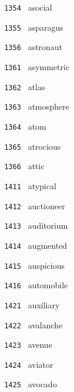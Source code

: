 \documentclass[11pt]{article}
\begin{document}
\begin{multicols}{6}
\noindent \texttt{ 1354 } \hspace{1mm} asocial  \par
\noindent \texttt{ 1355 } \hspace{1mm} asparagus  \par
\noindent \texttt{ 1356 } \hspace{1mm} astronaut  \par
\noindent \texttt{ 1361 } \hspace{1mm} asymmetric  \par
\noindent \texttt{ 1362 } \hspace{1mm} atlas  \par
\noindent \texttt{ 1363 } \hspace{1mm} atmosphere  \par
\noindent \texttt{ 1364 } \hspace{1mm} atom  \par
\noindent \texttt{ 1365 } \hspace{1mm} atrocious  \par
\noindent \texttt{ 1366 } \hspace{1mm} attic  \par
\noindent \texttt{ 1411 } \hspace{1mm} atypical  \par
\noindent \texttt{ 1412 } \hspace{1mm} auctioneer  \par
\noindent \texttt{ 1413 } \hspace{1mm} auditorium  \par
\noindent \texttt{ 1414 } \hspace{1mm} augmented  \par
\noindent \texttt{ 1415 } \hspace{1mm} auspicious  \par
\noindent \texttt{ 1416 } \hspace{1mm} automobile  \par
\noindent \texttt{ 1421 } \hspace{1mm} auxiliary  \par
\noindent \texttt{ 1422 } \hspace{1mm} avalanche  \par
\noindent \texttt{ 1423 } \hspace{1mm} avenue  \par
\noindent \texttt{ 1424 } \hspace{1mm} aviator  \par
\noindent \texttt{ 1425 } \hspace{1mm} avocado  \par

\end{multicols}
\end{document}
